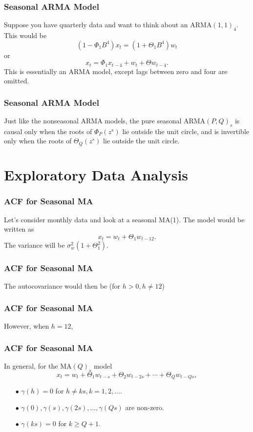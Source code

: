 \documentclass[%
xcolor=pdftex]{beamer}
\begin{document}
\begin{frame}
\frametitle{Seasonal ARMA Model}

Suppose you have quarterly data and want to think about an ARMA$(1,1)_4$.  This would be
$$
(1-\Phi_1 B^4) x_t=(1+\Theta_1 B^4) w_t
$$
or
$$
x_t=\Phi_1 x_{t-4}+w_t+\Theta w_{t-4}.
$$
This is essentially an ARMA model, except lags between zero and four are omitted.

\end{frame}

\begin{frame}
\frametitle{Seasonal ARMA Model}

Just like the nonseasonal ARMA models, the pure seasonal ARMA$(P,Q)_s$ is causal only when the roots of $\Phi_P(z^s)$ lie outside the unit circle, and is invertible only when the roots of $\Theta_Q(z^s)$ lie outside the unit circle.
\end{frame}

\section{Exploratory Data Analysis}
\frame{\tableofcontents[currentsection]}

\begin{frame}
\frametitle{ACF for Seasonal MA}

Let's consider monthly data and look at a seasonal MA(1).  The model would be written as
$$
x_t=w_t+ \Theta_1 w_{t-12}.
$$
The variance will be $\sigma_w^2(1+\Theta_1^2)$.

\end{frame}

\begin{frame}
\frametitle{ACF for Seasonal MA}

The autocovariance would then be (for $h>0, h\neq12$)

\vspace{50mm}

\end{frame}

\begin{frame}
\frametitle{ACF for Seasonal MA}

However, when $h=12$,

\vspace{50mm}

\end{frame}

\begin{frame}
\frametitle{ACF for Seasonal MA}

In general, for the MA$(Q)_s$ model
$$
x_t = w_t + \Theta_1 w_{t-s} + \Theta_2 w_{t-2s} + \cdots + \Theta_Q w_{t-Qs},
$$
\begin{itemize}
\item[$\bullet$] $\gamma(h)=0$ for $h\ne ks, k=1,2,\ldots.$
\item[$\bullet$] $\gamma(0),\gamma(s),\gamma(2s),\ldots,\gamma(Qs)$ are non-zero.
\item[$\bullet$] $\gamma(ks)=0$ for $k\ge Q+1$.
\end{itemize}

\end{frame}
\end{document}
